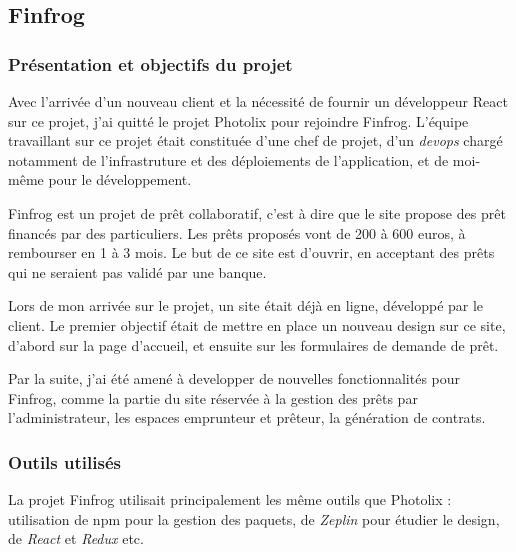 \documentclass[12pt,a4paper]{article}
\begin{document}
  \subsection{Finfrog}\label{finfrog}

  \subsubsection{Présentation et objectifs du
  projet}\label{pruxe9sentation-et-objectifs-du-projet-1}

  \bigskip

  Avec l'arrivée d'un nouveau client et la nécessité de fournir un
  développeur React sur ce projet, j'ai quitté le projet Photolix pour
  rejoindre Finfrog. L'équipe travaillant sur ce projet était constituée
  d'une chef de projet, d'un \emph{devops} chargé notamment de
  l'infrastruture et des déploiements de l'application, et de moi-même
  pour le développement.

  \bigskip

  Finfrog est un projet de prêt collaboratif, c'est à dire que le site
  propose des prêt financés par des particuliers. Les prêts proposés vont
  de 200 à 600 euros, à rembourser en 1 à 3 mois. Le but de ce site est
  d'ouvrir, en acceptant des prêts qui ne seraient pas validé par une
  banque.

  \bigskip

  Lors de mon arrivée sur le projet, un site était déjà en ligne,
  développé par le client. Le premier objectif était de mettre en place un
  nouveau design sur ce site, d'abord sur la page d'accueil, et ensuite
  sur les formulaires de demande de prêt.

  \bigskip

  Par la suite, j'ai été amené à developper de nouvelles fonctionnalités
  pour Finfrog, comme la partie du site réservée à la gestion des prêts
  par l'administrateur, les espaces emprunteur et prêteur, la génération
  de contrats.

  \subsubsection{Outils utilisés}\label{outils-utilisuxe9s-1}

  \bigskip

  La projet Finfrog utilisait principalement les même outils que Photolix
  : utilisation de npm pour la gestion des paquets, de \emph{Zeplin} pour
  étudier le design, de \emph{React} et \emph{Redux} etc.
\end{document}
